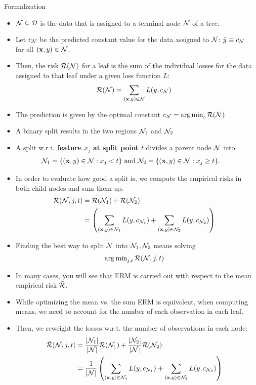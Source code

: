 \documentclass[11pt,compress,t,notes=noshow, xcolor=table]{beamer}
\begin{document}
\begin{vbframe}{Formalization}

\begin{itemize}
\item $\mathcal{N} \subseteq \mathcal{D}$ is the data that is assigned to a terminal node $\mathcal{N}$ of a tree.
\item Let $c_{\mathcal{N}}$ be the predicted constant value for the data assigned to $\mathcal{N}$: $\hat{y} \equiv c_{\mathcal{N}}$ for all $\left(\mathbf{x}, y\right) \in \mathcal{N}$.
\item Then, the risk $\mathcal{R}(\mathcal{N})$ for a leaf is the sum of the individual losses for the data assigned to that leaf under a given loss function $L$:
  $$\mathcal{R}(\mathcal{N}) = \sum\limits_{(\mathbf{x}, y) \in \mathcal{N}} L(y, c_{\mathcal{N}})$$
\item The prediction is given by the optimal constant $c_{\mathcal{N}} = \operatorname{arg\,min}_c \mathcal{R}(\mathcal{N})$
\item A binary split results in the two regions $\mathcal{N}_1$ and $\mathcal{N}_2$
\end{itemize}

\framebreak

\begin{itemize}
\item A split w.r.t. \textbf{feature $x_j$ at split point $t$} divides a parent node $\mathcal{N}$ into 
  \begin{align*}
    \mathcal{N}_1 &= \{ (\mathbf{x}, y) \in \mathcal{N}: x_j < t \} \text{ and } \mathcal{N}_2 = \{ (\mathbf{x}, y) \in \mathcal{N}: x_j \geq t \}.
  \end{align*}
\item   
  In order to evaluate how good a split is, we compute the empirical risks
  in both child nodes and sum them up.
     \begin{align*}
      \mathcal{R}(\mathcal{N}, j, t) &=  \mathcal{R}(\mathcal{N}_1) +  \mathcal{R}(\mathcal{N}_2) \\
                  &= \left(\sum\limits_{(\mathbf{x},y) \in \mathcal{N}_1} L(y, c_{\mathcal{N}_1}) + \sum\limits_{(\mathbf{x},y) \in \mathcal{N}_2} L(y, c_{\mathcal{N}_2})\right)
      \end{align*}
  \item Finding the best way to split $\mathcal{N}$ into $\mathcal{N}_1, \mathcal{N}_2$ means solving
  $$\operatorname{arg\,min}_{j, t} \mathcal{R}(\mathcal{N}, j, t)$$
\end{itemize}

\framebreak
\begin{itemize}

\item In many cases, you will see that ERM is carried out with respect to the mean empirical risk $\bar{\mathcal{R}}$.
\item While optimizing the mean vs. the sum ERM is equivalent, when computing means, we need to account for the number of each observation in each leaf.
\item Then, we reweight the losses w.r.t. the number of observations in each node:
     \begin{align*}
      \bar{\mathcal{R}}(\mathcal{N}, j, t) &= \frac{|\mathcal{N}_1|}{|\mathcal{N}|} \mathcal{R}(\mathcal{N}_1) + \frac{|\mathcal{N}_2|}{|\mathcal{N}|} \mathcal{R}(\mathcal{N}_2) \\
                  &= \frac{1}{|\mathcal{N}|}\left(\sum\limits_{(\mathbf{x},y) \in \mathcal{N}_1} L(y, c_{\mathcal{N}_1}) + \sum\limits_{(\mathbf{x},y) \in \mathcal{N}_2} L(y, c_{\mathcal{N}_2})\right)
      \end{align*}


\end{itemize}
\end{vbframe}
\end{document}
